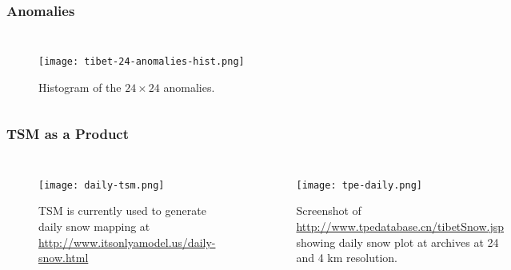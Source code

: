 \begin{frame}
\frametitle{Anomalies}
\begin{columns}
\begin{table}
\centering
\caption{Anomaly Distribution Properties}
\hspace*{.5cm}
\end{table}
\begin{figure}
\hspace*{1cm}
\centering
\begin{minipage}{1\columnwidth}
\texttt{[image: tibet-24-anomalies-hist.png]}
\caption{Histogram of the $24 \times 24$ anomalies.}
\end{minipage}
\end{figure}
\end{columns}
\end{frame}

\begin{frame}
\frametitle{TSM as a Product}
\begin{columns}
\begin{figure}
\vspace*{-1cm}
\centering
\begin{minipage}{1\columnwidth}
\texttt{[image: daily-tsm.png]}
\caption{TSM is currently used to generate daily snow mapping at \url{http://www.itsonlyamodel.us/daily-snow.html}}
\end{minipage}
\end{figure}
\begin{figure}
\vspace*{-.25cm}
\centering
\begin{minipage}{1\columnwidth}
\texttt{[image: tpe-daily.png]}
\caption{Screenshot of \url{http://www.tpedatabase.cn/tibetSnow.jsp} showing daily snow plot at archives at 24 and 4 km resolution.}
\end{minipage}
\end{figure}
\end{columns}
\end{frame}

